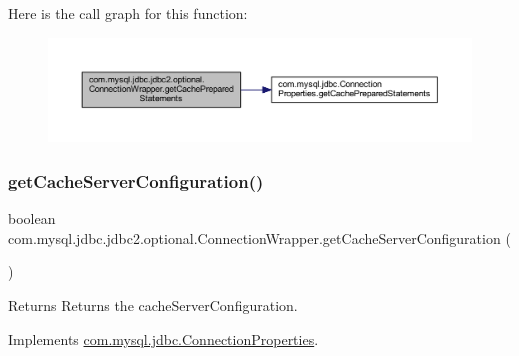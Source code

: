 Here is the call graph for this function\+:
\nopagebreak
\begin{figure}[H]
\begin{center}
\leavevmode
\includegraphics[width=350pt]{classcom_1_1mysql_1_1jdbc_1_1jdbc2_1_1optional_1_1_connection_wrapper_aa4e1e497dd1bc9785a1959db9989a97c_cgraph}
\end{center}
\end{figure}
\mbox{\label{classcom_1_1mysql_1_1jdbc_1_1jdbc2_1_1optional_1_1_connection_wrapper_a3338701a08234fb035685c6e0ce5b77c}} 
\subsubsection{\texorpdfstring{get\+Cache\+Server\+Configuration()}{getCacheServerConfiguration()}}
{\footnotesize\ttfamily boolean com.\+mysql.\+jdbc.\+jdbc2.\+optional.\+Connection\+Wrapper.\+get\+Cache\+Server\+Configuration (\begin{DoxyParamCaption}{ }\end{DoxyParamCaption})}

\begin{DoxyReturn}{Returns}
Returns the cache\+Server\+Configuration. 
\end{DoxyReturn}


Implements \mbox{\hyperlink{interfacecom_1_1mysql_1_1jdbc_1_1_connection_properties_a8827c77268d7c5b63d6f225cb955f70c}{com.\+mysql.\+jdbc.\+Connection\+Properties}}.

